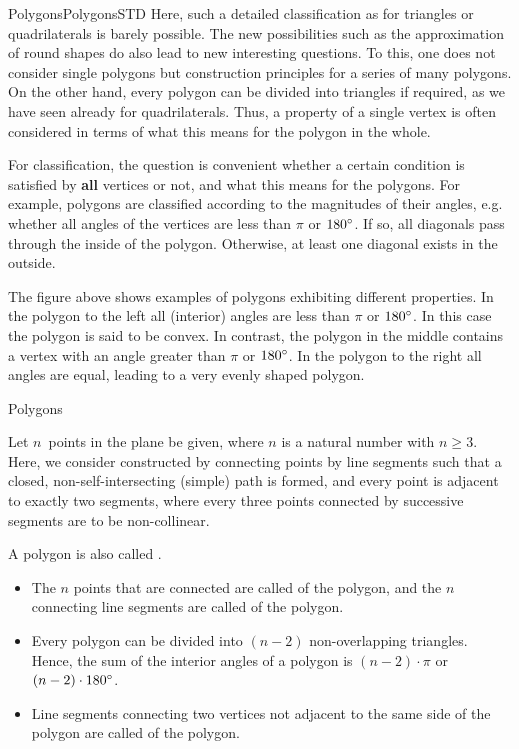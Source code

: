 \begin{MXContent}{Polygons}{Polygons}{STD}
Here, such a detailed classification as for triangles or quadrilaterals is barely 
possible. The new possibilities such as the approximation of round shapes do also lead 
to new interesting questions. To this, one does not consider single polygons but construction 
principles for a series of many polygons. On the other hand, every polygon can be 
divided into triangles if required, as we have seen already for quadrilaterals.
Thus, a property of a single vertex is often considered in terms of what this means
for the polygon in the whole.

For classification, the question is convenient whether a certain condition is satisfied by 
\textbf{all} vertices or not, and what this means for the polygons. For example, polygons 
are classified according to the magnitudes of their angles, e.g. whether all angles of the 
vertices are less than $\pi$ or $180^{\circ}$. If so, all diagonals pass through the inside of the polygon. 
Otherwise, at least one diagonal exists in the outside.

The figure above shows examples of polygons exhibiting different properties. 
In the polygon to the left all (interior) angles are less than $\pi$ or $180^{\circ}$. In this 
case the polygon is said to be convex. In contrast, the polygon in the middle contains a vertex 
with an angle greater than $\pi$ or $180^{\circ}$. In the polygon to the right all angles are 
equal, leading to a very evenly shaped polygon.

\begin{MXInfo}{Polygons}%

Let $n$~points in the plane be given, where $n$ is a natural number with $n \geq 3$.
Here, we consider  constructed by connecting points by 
line segments such that a closed, non-self-intersecting (simple) path is formed, and 
every point is adjacent to exactly two segments, where every three points connected 
by successive segments are to be non-collinear. 

A polygon is also called . 


\begin{itemize}
\item The $n$ points that are connected are called 
of the polygon, and the $n$ connecting line segments are called 
of the polygon.
\item Every polygon can be divided into $(n-2)$ non-overlapping triangles. Hence, the sum of the 
interior angles of a polygon is $(n-2) \cdot \pi$ or $(n-2) \cdot 180^{\circ}$.
\item Line segments connecting two vertices not adjacent to the same side of the 
polygon are called  of the polygon.
\end{itemize}
\end{MXInfo}


\end{MXContent}

